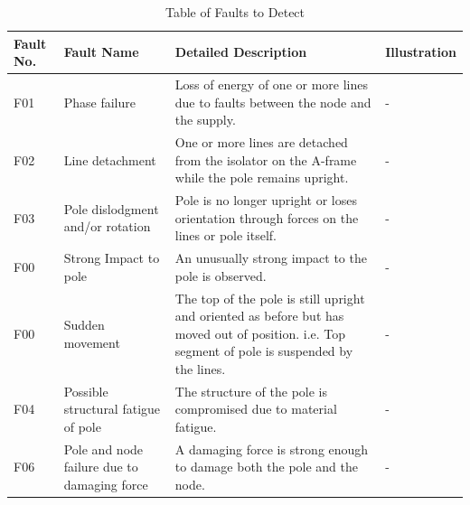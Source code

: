 \documentclass[12pt]{article}
\begin{document}
\begin{center}
  \begin{table}[htp!]
    \caption{Table of Faults to Detect}
    
    \hskip-2.2cm\begin{tabular}{|p{2cm}|p{4cm}|p{8cm}|p{4cm}|}
        \hline
        \textbf{Fault No.} & \textbf{Fault Name} & \textbf{Detailed Description} & \textbf{Illustration} \\
        \hline
        F01 & Phase failure & Loss  of  energy  of  one  or  more  lines  due  to  faults
        between the node and the supply. & - \\\hline

        F02 & Line detachment & One or more lines are detached from the isolator on the A-frame while the pole remains
        upright. & - \\\hline

        F03 & Pole dislodgment and/or rotation & Pole is no longer upright or loses orientation through forces on the
        lines or pole itself. & - \\\hline

        F00 & Strong Impact to pole & An unusually strong impact to the pole is observed. & - \\\hline

        F00 & Sudden movement & The top of the pole is still upright and oriented as before but has moved out of
        position. i.e. Top segment of pole is suspended by the lines. & - \\\hline
        F04 & Possible structural fatigue of pole & The structure of the pole is compromised due to material fatigue. & - \\\hline

        F06 & Pole and node failure due to damaging force & A damaging force is strong enough to damage both the pole
        and the node. & - \\\hline
  
    \end{tabular}    
  
  \label{tab:faults}
  \end{table}
\end{center}
\end{document}
